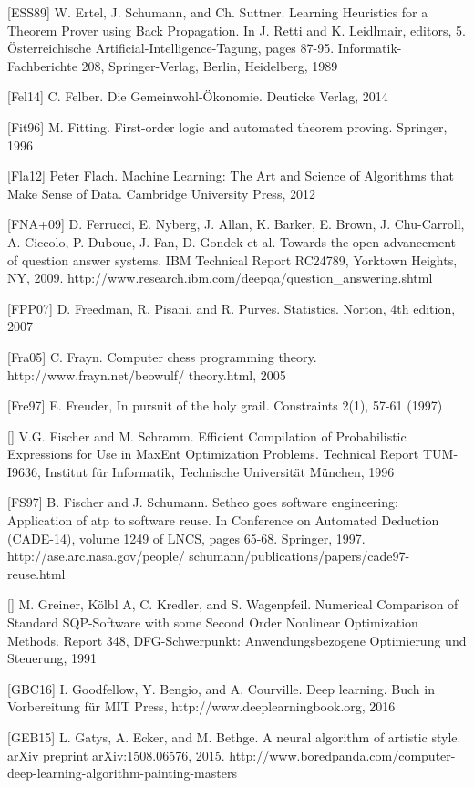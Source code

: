 \documentclass[10pt]{book}
\begin{document}
\begin{center}
[ESS89] W. Ertel, J. Schumann, and Ch. Suttner. Learning Heuristics for a Theorem Prover using Back Propagation. In J. Retti and K. Leidlmair, editors, 5. Österreichische Artificial-Intelligence-Tagung, pages 87-95. Informatik-Fachberichte 208, Springer-Verlag, Berlin, Heidelberg, 1989

[Fel14] C. Felber. Die Gemeinwohl-Ökonomie. Deuticke Verlag, 2014

[Fit96] M. Fitting. First-order logic and automated theorem proving. Springer, 1996

[Fla12] Peter Flach. Machine Learning: The Art and Science of Algorithms that Make Sense of Data. Cambridge University Press, 2012

[FNA+09] D. Ferrucci, E. Nyberg, J. Allan, K. Barker, E. Brown, J. Chu-Carroll, A. Ciccolo, P. Duboue, J. Fan, D. Gondek et al. Towards the open advancement of question answer systems. IBM Technical Report RC24789, Yorktown Heights, NY, 2009. http://www.research.ibm.com/deepqa/question\_answering.shtml

[FPP07] D. Freedman, R. Pisani, and R. Purves. Statistics. Norton, 4th edition, 2007

[Fra05] C. Frayn. Computer chess programming theory. http://www.frayn.net/beowulf/ theory.html, 2005

[Fre97] E. Freuder, In pursuit of the holy grail. Constraints 2(1), 57-61 (1997)

[\cite{fs96}] V.G. Fischer and M. Schramm. Efficient Compilation of Probabilistic Expressions for Use in MaxEnt Optimization Problems. Technical Report TUM-I9636, Institut für Informatik, Technische Universität München, 1996

[FS97] B. Fischer and J. Schumann. Setheo goes software engineering: Application of atp to software reuse. In Conference on Automated Deduction (CADE-14), volume 1249 of LNCS, pages 65-68. Springer, 1997. http://ase.arc.nasa.gov/people/ schumann/publications/papers/cade97-reuse.html

[\cite{gakw91}] M. Greiner, Kölbl A, C. Kredler, and S. Wagenpfeil. Numerical Comparison of Standard SQP-Software with some Second Order Nonlinear Optimization Methods. Report 348, DFG-Schwerpunkt: Anwendungsbezogene Optimierung und Steuerung, 1991

[GBC16] I. Goodfellow, Y. Bengio, and A. Courville. Deep learning. Buch in Vorbereitung für MIT Press, http://www.deeplearningbook.org, 2016

[GEB15] L. Gatys, A. Ecker, and M. Bethge. A neural algorithm of artistic style. arXiv preprint arXiv:1508.06576, 2015. http://www.boredpanda.com/computer-deep-learning-algorithm-painting-masters


\end{center}
\end{document}
